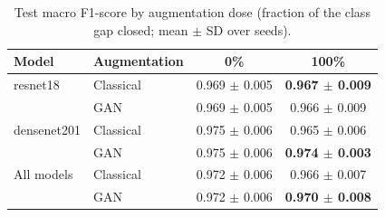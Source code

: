 \begin{table}[htbp]
\centering
\caption{Test macro F1-score by augmentation dose (fraction of the class gap closed; mean $\pm$ SD over seeds).}
\label{tab:dose_macro_f1}
\begin{tabular}{llcc}
\toprule
Model & Augmentation & 0\% & 100\% \\
\midrule
resnet18 & Classical & 0.969 $\pm$ 0.005 & \textbf{0.967 $\pm$ 0.009} \\
 & GAN & 0.969 $\pm$ 0.005 & 0.966 $\pm$ 0.009 \\
\addlinespace
densenet201 & Classical & 0.975 $\pm$ 0.006 & 0.965 $\pm$ 0.006 \\
 & GAN & 0.975 $\pm$ 0.006 & \textbf{0.974 $\pm$ 0.003} \\
\addlinespace
All models & Classical & 0.972 $\pm$ 0.006 & 0.966 $\pm$ 0.007 \\
 & GAN & 0.972 $\pm$ 0.006 & \textbf{0.970 $\pm$ 0.008} \\
\bottomrule
\end{tabular}
\end{table}